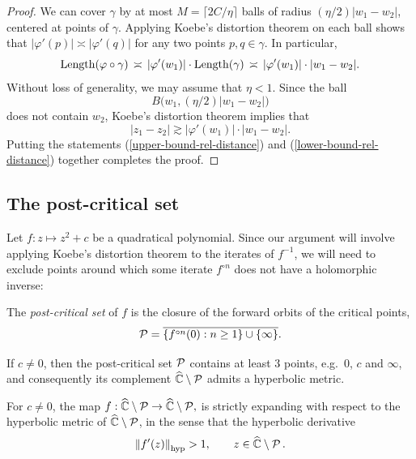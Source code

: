 \begin{proof}
We can cover $\gamma$ by at most $M = \lceil 2C/\eta \rceil$ balls of radius $(\eta/2)|w_1-w_2|$, centered at points of $\gamma$.
Applying Koebe's distortion theorem on each ball shows that
$|\varphi'(p)| \asymp |\varphi'(q)|$ for any two points $p, q \in \gamma$. In particular,
\begin{equation}
\label{upper-bound-rel-distance}
\operatorname{Length}(\varphi \circ \gamma) \, \asymp \, |\varphi'(w_1)| \cdot \operatorname{Length}(\gamma) \, \asymp \, |\varphi'(w_1)| \cdot |w_1 - w_2|.
\end{equation}
Without loss of generality, we may assume that $\eta < 1$. Since the ball $$B \bigl (w_1, (\eta/2) |w_1 - w_2| \bigr )$$ does not contain $w_2$, Koebe's distortion theorem implies that
\begin{equation}
\label{lower-bound-rel-distance}
|z_1-z_2| \gtrsim |\varphi'(w_1)| \cdot |w_1 - w_2|.
\end{equation}
Putting the statements (\ref{upper-bound-rel-distance}) and (\ref{lower-bound-rel-distance}) together completes the proof.
\end{proof}


\subsection{The post-critical set}

Let $f: z\mapsto z^2+c$ be a quadratical polynomial. 
Since our argument will involve applying Koebe's distortion theorem to the iterates of $f^{-1}$, 
we will need to exclude points around which some iterate $f^{\circ n}$ does not have a holomorphic inverse:

\begin{definition} \label{def:post-crit}
	The \emph{post-critical set} of $f$ is the closure of the forward orbits 
	of the critical points,
	\begin{equation*}
		\operatorname{\mathcal P} = \overline{\{f^{\circ n} (0): n \geq 1\} \cup \{\infty\}}.
	\end{equation*}	
\end{definition}

If $c \neq 0$, then the post-critical set $\operatorname{\mathcal P}$ contains at least $3$ points, e.g.~$0$, $c$ and $\infty$, and consequently its complement $\widehat{\mathbb C} \setminus \operatorname{\mathcal P}$
admits a hyperbolic metric.

 \begin{theorem}\label{theorem:hyperbolic_expanding}
For $c \neq 0$, the map
$f: \widehat {\mathbb C} \setminus \operatorname{\mathcal P} \to \widehat {\mathbb C} \setminus \operatorname{\mathcal P},$
is strictly expanding with respect to the hyperbolic metric of $\widehat {\mathbb C} \setminus \operatorname{\mathcal P}$, in the sense that the hyperbolic derivative
\begin{equation}\label{eq:hyp-derivative-bound}
	\left\Vert f'(z)\right\Vert_{\operatorname{hyp}} > 1, \qquad z\in \widehat {\mathbb C} \setminus \operatorname{\mathcal P}.
\end{equation}
 \end{theorem}
 
